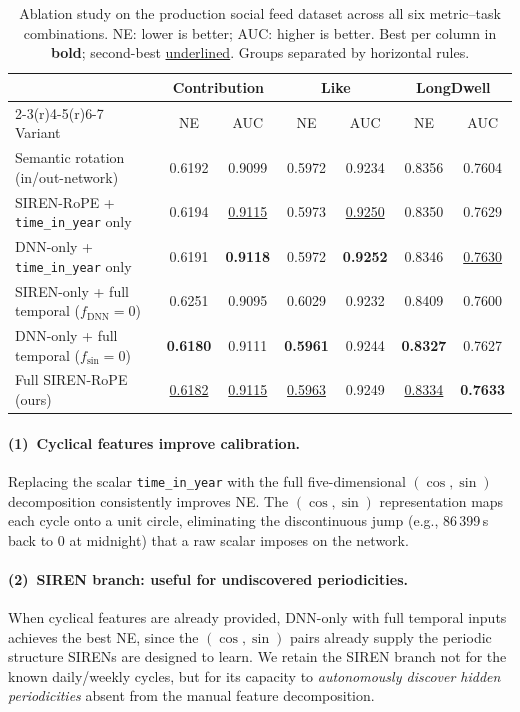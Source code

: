 \documentclass{article}
\begin{document}
\begin{table}[t]
  \caption{Ablation study on the production social feed dataset across all
    six metric--task combinations. NE: lower is better; AUC: higher is
    better. Best per column in \textbf{bold}; second-best
    \underline{underlined}. Groups separated by horizontal rules.}
  \label{tab:ablation}
  \centering
  \small
  \begin{tabular}{lcccccc}
    \toprule
    & \multicolumn{2}{c}{Contribution} & \multicolumn{2}{c}{Like}
    & \multicolumn{2}{c}{LongDwell} \\
    \cmidrule(r){2-3}\cmidrule(r){4-5}\cmidrule(r){6-7}
    Variant & NE & AUC & NE & AUC & NE & AUC \\
    \midrule
    Semantic rotation (in/out-network) & 0.6192 & 0.9099 & 0.5972 & 0.9234 & 0.8356 & 0.7604 \\
    \midrule
    SIREN-RoPE + \texttt{time\_in\_year} only           & 0.6194 & \underline{0.9115} & 0.5973 & \underline{0.9250} & 0.8350 & 0.7629 \\
    DNN-only + \texttt{time\_in\_year} only            & 0.6191 & \textbf{0.9118}   & 0.5972 & \textbf{0.9252}   & 0.8346 & \underline{0.7630} \\
    SIREN-only + full temporal ($f_{\mathrm{DNN}}\!=\!0$)  & 0.6251 & 0.9095 & 0.6029 & 0.9232 & 0.8409 & 0.7600 \\
    DNN-only + full temporal ($f_{\mathrm{sin}}\!=\!0$)    & \textbf{0.6180} & 0.9111 & \textbf{0.5961} & 0.9244 & \textbf{0.8327} & 0.7627 \\
    Full SIREN-RoPE (ours)                              & \underline{0.6182} & \underline{0.9115} & \underline{0.5963} & 0.9249 & \underline{0.8334} & \textbf{0.7633} \\
    \bottomrule
  \end{tabular}
\end{table}

\paragraph{(1)~Cyclical features improve calibration.}
Replacing the scalar \texttt{time\_in\_year} with the full five-dimensional
$(\cos,\sin)$ decomposition consistently improves NE. The $(\cos,\sin)$
representation maps each cycle onto a unit circle, eliminating the
discontinuous jump (e.g., 86\,399\,s back to 0 at midnight) that a raw
scalar imposes on the network.

\paragraph{(2)~SIREN branch: useful for undiscovered periodicities.}
When cyclical features are already provided, DNN-only with full temporal
inputs achieves the best NE, since the $(\cos,\sin)$ pairs already supply
the periodic structure SIRENs are designed to learn. We retain the SIREN
branch not for the known daily/weekly cycles, but for its capacity to
\emph{autonomously discover hidden periodicities} absent from the manual
feature decomposition.
\end{document}
